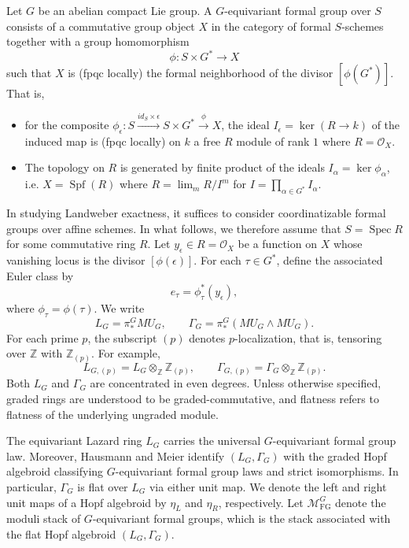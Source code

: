 \documentclass[11pt,reqno]{amsart}
\newcommand{\Spec}{\operatorname{Spec}}
\newcommand{\MFG}{\mathcal M_{\mathrm{FG}}}
\newcommand{\bbZ}{\mathbb Z}
\newcommand{\tensor}{\otimes}
\begin{document}
Let $G$ be an abelian compact Lie group. A $G$-equivariant formal group over $S$ consists of a commutative group object $X$ in the category of formal $S$-schemes together with a group homomorphism $$\phi:S\times G^*\to X$$ such that $X$ is (fpqc locally) the formal neighborhood of the divisor $[\phi(G^*)]$. That is, 
    \begin{itemize}
        \item[\quad (1)] for the composite $\phi_\epsilon:S\overset{id_S\times \epsilon}{\longrightarrow}S\times G^*\overset{\phi}{\longrightarrow}X$, the ideal $I_\epsilon=\ker(R\to k)$ of the induced map is (fpqc locally) on $k$ a free $R$ module of rank $1$ where $R=\mathcal O_X$.
    \item[\quad (2)] The topology on $R$ is generated by finite product of the ideals $I_\alpha=\ker \phi_\alpha$, i.e. $X=\operatorname{Spf}(R)$ where $R=\lim_m R/I^m$ for $I=\prod_{\alpha\in G^*} I_\alpha$.
    \end{itemize}
In studying Landweber exactness, it suffices to consider coordinatizable formal groups over affine schemes. In what follows, we therefore assume that $S=\Spec R$ for some commutative ring $R$. Let $y_\epsilon\in R=\mathcal O_X$ be a function on $X$ whose vanishing locus is the divisor $[\phi(\epsilon)]$. For each $\tau\in G^*$, define the associated Euler class by
\[
e_\tau=\phi_\tau^*(y_\epsilon),
\]
where $\phi_\tau=\phi(\tau)$.  We write
\[
L_G=\pi_*^G MU_G,
\qquad
\Gamma_G=\pi_*^G(MU_G\wedge MU_G).
\]
For each prime $p$, the subscript $(p)$ denotes $p$-localization, that is, tensoring over $\bbZ$ with $\bbZ_{(p)}$. For example,
\[
L_{G,(p)}=L_G\tensor_{\bbZ}\bbZ_{(p)},
\qquad
\Gamma_{G,(p)}=\Gamma_G\tensor_{\bbZ}\bbZ_{(p)}.
\]
Both $L_G$ and $\Gamma_G$ are concentrated in even degrees. Unless otherwise specified, graded rings are understood to be graded-commutative, and flatness refers to flatness of the underlying ungraded module.

The equivariant Lazard ring $L_G$ carries the universal $G$-equivariant formal group law. Moreover, Hausmann and Meier \cite[Proposition~3.2 and Corollary~3.7]{hausmann2023invariant} identify $(L_G,\Gamma_G)$ with the graded Hopf algebroid classifying $G$-equivariant formal group laws and strict isomorphisms. In particular, $\Gamma_G$ is flat over $L_G$ via either unit map. We denote the left and right unit maps of a Hopf algebroid by $\eta_L$ and $\eta_R$, respectively. Let $\MFG^G$ denote the moduli stack of $G$-equivariant formal groups, which is the stack associated with the flat Hopf algebroid $(L_G,\Gamma_G)$. 
\end{document}
